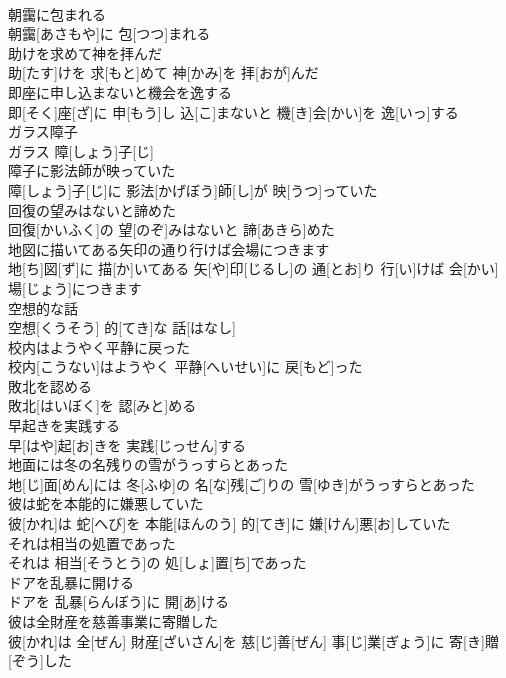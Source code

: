 \documentclass[8pt]{extreport}
\begin{document}
\begin{CJK}{UTF8}{min}
\\	朝靄に包まれる	
\\	朝靄[あさもや]に 包[つつ]まれる
\\	助けを求めて神を拝んだ	
\\	助[たす]けを 求[もと]めて 神[かみ]を 拝[おが]んだ
\\	即座に申し込まないと機会を逸する	
\\	即[そく]座[ざ]に 申[もう]し 込[こ]まないと 機[き]会[かい]を 逸[いっ]する
\\	ガラス障子	
\\	ガラス 障[しょう]子[じ]
\\	障子に影法師が映っていた	
\\	障[しょう]子[じ]に 影法[かげぼう]師[し]が 映[うつ]っていた
\\	回復の望みはないと諦めた	
\\	回復[かいふく]の 望[のぞ]みはないと 諦[あきら]めた
\\	地図に描いてある矢印の通り行けば会場につきます	
\\	地[ち]図[ず]に 描[か]いてある 矢[や]印[じるし]の 通[とお]り 行[い]けば 会[かい]場[じょう]につきます
\\	空想的な話	
\\	空想[くうそう] 的[てき]な 話[はなし]
\\	校内はようやく平静に戻った	
\\	校内[こうない]はようやく 平静[へいせい]に 戻[もど]った
\\	敗北を認める	
\\	敗北[はいぼく]を 認[みと]める
\\	早起きを実践する	
\\	早[はや]起[お]きを 実践[じっせん]する
\\	地面には冬の名残りの雪がうっすらとあった	
\\	地[じ]面[めん]には 冬[ふゆ]の 名[な]残[ご]りの 雪[ゆき]がうっすらとあった
\\	彼は蛇を本能的に嫌悪していた	
\\	彼[かれ]は 蛇[へび]を 本能[ほんのう] 的[てき]に 嫌[けん]悪[お]していた
\\	それは相当の処置であった	
\\	それは 相当[そうとう]の 処[しょ]置[ち]であった
\\	ドアを乱暴に開ける	
\\	ドアを 乱暴[らんぼう]に 開[あ]ける
\\	彼は全財産を慈善事業に寄贈した	
\\	彼[かれ]は 全[ぜん] 財産[ざいさん]を 慈[じ]善[ぜん] 事[じ]業[ぎょう]に 寄[き]贈[ぞう]した

\end{CJK}
\end{document}
